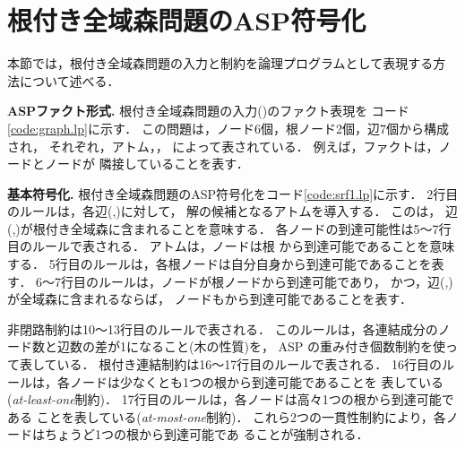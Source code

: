 ﻿\section{根付き全域森問題のASP符号化}\label{chap:encode}

本節では，根付き全域森問題の入力と制約を論理プログラムとして表現する方
法について述べる．



\textbf{ASPファクト形式.} 
根付き全域森問題の入力()のファクト表現を
コード\ref{code:graph.lp}に示す．
この問題は，ノード6個，根ノード2個，辺7個から構成され，
それぞれ，アトム，，
によって表されている．
例えば，ファクトは，ノードとノードが
隣接していることを表す．



\textbf{基本符号化.}
根付き全域森問題のASP符号化をコード\ref{code:srf1.lp}に示す．
2行目のルールは，各辺(,)に対して，
解の候補となるアトムを導入する．
このは，
辺(,)が根付き全域森に含まれることを意味する．
%
各ノードの到達可能性は5～7行目のルールで表される．
アトムは，ノードは根
から到達可能であることを意味する．
5行目のルールは，各根ノードは自分自身から到達可能であることを表す．
6～7行目のルールは，ノードが根ノードから到達可能であり，
かつ，辺(,)が全域森に含まれるならば，
ノードもから到達可能であることを表す．

非閉路制約は10～13行目のルールで表される．
このルールは，各連結成分のノード数と辺数の差が1になること(木の性質)を，
ASP の重み付き個数制約を使って表している．
%
根付き連結制約は16～17行目のルールで表される．
16行目のルールは，各ノードは少なくとも1つの根から到達可能であることを
表している(\textit{at-least-one}制約)．
17行目のルールは，各ノードは高々1つの根から到達可能である
ことを表している(\textit{at-most-one}制約)．
これら2つの一貫性制約により，各ノードはちょうど1つの根から到達可能であ
ることが強制される．

